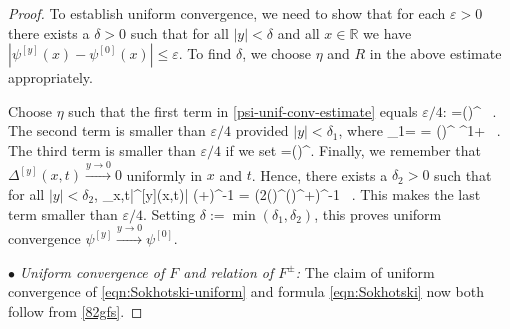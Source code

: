 \documentclass[12pt]{article}
\theoremstyle{plain}
\theoremstyle{definition}
\numberwithin{equation}{section}
\numberwithin{theorem}{section}
\def\be#1\ee{\begin{equation}#1\end{equation}}
\newcommand\eps           {\varepsilon}
\newcommand\Rb            {\mathbb{R}}
\begin{document}
\begin{proof}
To establish uniform convergence, we need to show that for each $\eps>0$ there exists a $\delta>0$ such that for all $|y|<\delta$ and all $x \in \Rb$ we have $|\psi^{[y]}(x)-\psi^{[0]}(x)| \leq\eps$. To find $\delta$, we choose $\eta$ and $R$ in the above estimate appropriately. 

Choose $\eta$ such that the first term in \eqref{psi-unif-conv-estimate} equals $\varepsilon/4$: 
\be
\eta=\left(\right)^{}
\ .
\ee
The second term is smaller than $\varepsilon/4$ provided $|y|<\delta_1$, where 
\be
\delta_1= \frac{\eta \, \eps}{16 \, S} =  \left(\right)^{}
\eps^{1+\alpha}
\ .
\ee
 The third term is smaller than $\varepsilon/4$ if we set 
\be
R=\left(\right)^{}.
\ee
 Finally, we remember that  $\Delta^{[y]}(x,t)\xrightarrow{y\to 0}0$ uniformly in $x$ and $t$. Hence, there exists a $\delta_2>0$ such that for all $|y|< \delta_2$,
\be
\sup_{x,t\in{}}|\Delta^{[y]}(x,t)| \leq {}\left(+\pi\right)^{-1} = \left(2\left(\right)^{}\left(\right)^{}+\pi\right)^{-1} \ .
\ee
This makes the last term smaller than $\varepsilon/4$.
Setting $\delta :=  \min(\delta_1,\delta_2)$, this proves uniform convergence $\psi^{[y]} \xrightarrow{y \to 0} \psi^{[0]}$.

\medskip

\noindent
$\bullet$
{\em Uniform convergence of $F$ and relation of $F^\pm$:}
The claim of uniform convergence of \eqref{eqn:Sokhotski-uniform} and formula \eqref{eqn:Sokhotski}  now both follow from \eqref{82gfs}.


\medskip


\end{proof}
\end{document}
